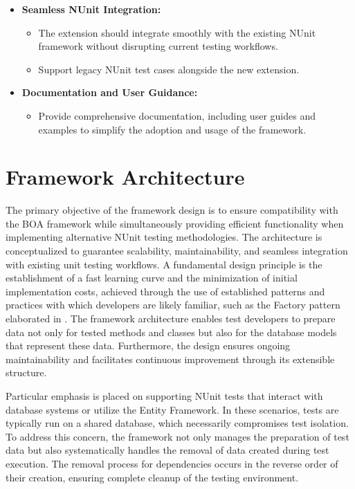 \begin{itemize}
	\item \textbf{Seamless NUnit Integration:}
	      \begin{itemize}
		      \item The extension should integrate smoothly with the existing NUnit framework without disrupting current testing workflows.
		      \item Support legacy NUnit test cases alongside the new extension.
	      \end{itemize}
	\item \textbf{Documentation and User Guidance:}
	      \begin{itemize}
		      \item Provide comprehensive documentation, including user guides and examples to simplify the adoption and usage of the framework.
	      \end{itemize}
\end{itemize}

\section{Framework Architecture }

The primary objective of the framework design is to ensure compatibility with the \ac{BOA} framework while simultaneously providing efficient functionality when implementing alternative NUnit testing methodologies. The architecture is conceptualized to guarantee scalability, maintainability, and seamless integration with existing unit testing workflows. A fundamental design principle is the establishment of a fast learning curve and the minimization of initial implementation costs, achieved through the use of established patterns and practices with which developers are likely familiar, such as the Factory pattern elaborated in . The framework architecture enables test developers to prepare data not only for tested methods and classes but also for the database models that represent these data. Furthermore, the design ensures ongoing maintainability and facilitates continuous improvement through its extensible structure.

Particular emphasis is placed on supporting NUnit tests that interact with database systems or utilize the Entity Framework. In these scenarios, tests are typically run on a shared database, which necessarily compromises test isolation. To address this concern, the framework not only manages the preparation of test data but also systematically handles the removal of data created during test execution. The removal process for dependencies occurs in the reverse order of their creation, ensuring complete cleanup of the testing environment.

